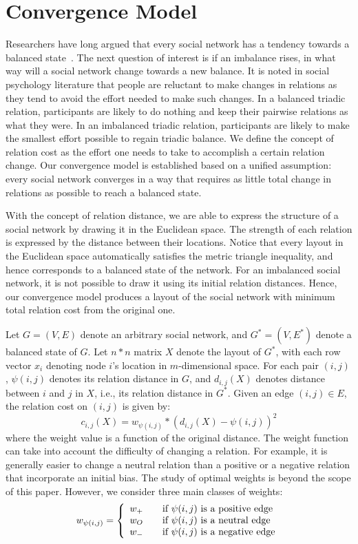 

\section{Convergence Model} \label{sec:mathmodel}
Researchers have long argued that every social network has a tendency
towards a balanced state~\cite{Doreian:02}.  The next question of
interest is if an imbalance rises, in what way will a social network
change towards a new balance.  It is noted in social psychology
literature that people are reluctant to make changes in relations as
they tend to avoid the effort needed to make such changes. In a balanced
triadic relation, participants are likely to do nothing and keep their
pairwise relations as what they were. In an imbalanced triadic
relation, participants are likely to make the smallest effort possible
to regain triadic balance. We define the concept of relation cost as
the effort one needs to take to accomplish a certain relation
change. Our convergence model is established based on a unified
assumption: every social network converges in a way that requires as
little total change in relations as possible to reach a balanced
state.

With the concept of relation distance, we are able to express the
structure of a social network by drawing it in the Euclidean
space. The strength of each relation is expressed by the distance
between their locations. Notice that every layout in the Euclidean
space automatically satisfies the metric triangle inequality, and
hence corresponds to a balanced state of the network.  For an
imbalanced social network, it is not possible to draw it using its
initial relation distances.  Hence, our convergence model produces a
layout of the social network with minimum total relation cost from the
original one.

Let $G=(V,E)$ denote an arbitrary social network, and $G^{*}=(V,
E^{*})$ denote a balanced state of $G$. Let $n*n$ matrix $X$ denote
the layout of $G^{*}$, with each row vector $x_{i}$ denoting node
$i$'s location in $m$-dimensional space. For each pair $(i,j)$,
$\psi(i,j)$ denotes its relation distance in $G$, and $d_{i,j}(X)$
denotes distance between $i$ and $j$ in $X$, i.e., its relation
distance in $G^{*}$.  Given an edge $(i,j)\in E$, the
relation cost on $(i,j)$ is given by:
\[c_{i, j}(X)=w_{\psi(i,j)}*(d_{i,j}(X)-\psi{(i,j)})^2\]
where the weight value is a function of the original distance. The
weight function can take into account the difficulty of changing a
relation. For example, it is generally easier to change a neutral
relation than a positive or a negative relation that incorporate an
initial bias. The study of optimal weights is beyond the scope of this
paper. However, we consider three main classes of weights:
\[
 w_{\psi(i,j)}= \left\{ 
  \begin{array}{l l}
    w_{+} & \quad \text{if $\psi(i,j)$ is a positive edge}\\
    w_{O} & \quad \text{if $\psi(i,j)$ is a neutral edge}\\
    w_{-} & \quad \text{if $\psi(i,j)$ is a negative edge}\\
  \end{array} \right.
\]

